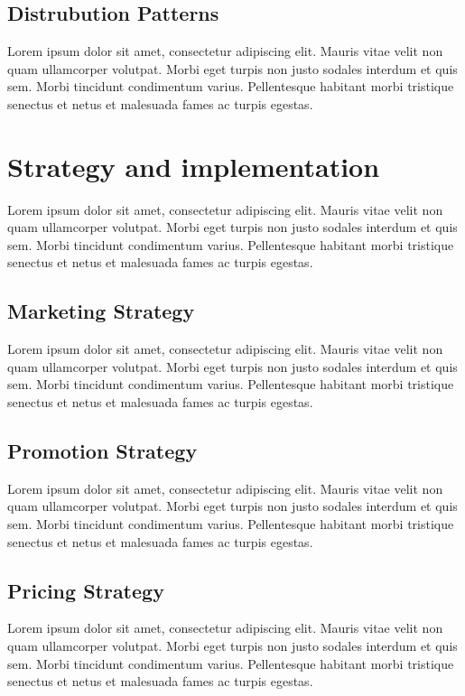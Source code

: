 \documentclass[11pt,titlepage]{article}
\begin{document}
\subsection{Distrubution Patterns}
Lorem ipsum dolor sit amet, consectetur adipiscing elit. Mauris vitae velit 
non quam ullamcorper volutpat. Morbi eget turpis non justo sodales interdum 
et quis sem. Morbi tincidunt condimentum varius. Pellentesque habitant morbi 
tristique senectus et netus et malesuada fames ac turpis egestas.\newline
\pagebreak

\section{Strategy and implementation}
Lorem ipsum dolor sit amet, consectetur adipiscing elit. Mauris vitae velit 
non quam ullamcorper volutpat. Morbi eget turpis non justo sodales interdum 
et quis sem. Morbi tincidunt condimentum varius. Pellentesque habitant morbi 
tristique senectus et netus et malesuada fames ac turpis egestas.\newline
\subsection{Marketing Strategy}
Lorem ipsum dolor sit amet, consectetur adipiscing elit. Mauris vitae velit 
non quam ullamcorper volutpat. Morbi eget turpis non justo sodales interdum 
et quis sem. Morbi tincidunt condimentum varius. Pellentesque habitant morbi 
tristique senectus et netus et malesuada fames ac turpis egestas.\newline
\subsection{Promotion  Strategy}
Lorem ipsum dolor sit amet, consectetur adipiscing elit. Mauris vitae velit 
non quam ullamcorper volutpat. Morbi eget turpis non justo sodales interdum 
et quis sem. Morbi tincidunt condimentum varius. Pellentesque habitant morbi 
tristique senectus et netus et malesuada fames ac turpis egestas.\newline
\subsection{Pricing Strategy}
Lorem ipsum dolor sit amet, consectetur adipiscing elit. Mauris vitae velit 
non quam ullamcorper volutpat. Morbi eget turpis non justo sodales interdum 
et quis sem. Morbi tincidunt condimentum varius. Pellentesque habitant morbi 
tristique senectus et netus et malesuada fames ac turpis egestas.\newline
\end{document}
